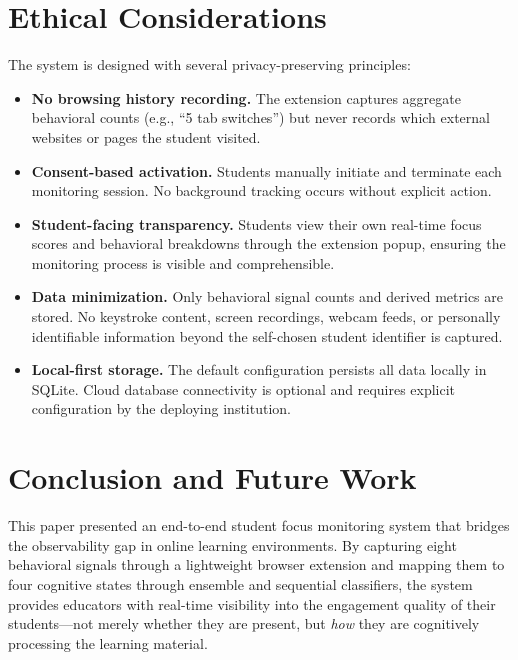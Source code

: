 \documentclass[conference]{IEEEtran}
\begin{document}
\section{Ethical Considerations}

The system is designed with several privacy-preserving principles:

\begin{itemize}[leftmargin=*]
    \item \textbf{No browsing history recording.} The extension captures aggregate behavioral counts (e.g., ``5 tab switches'') but never records which external websites or pages the student visited.
    \item \textbf{Consent-based activation.} Students manually initiate and terminate each monitoring session. No background tracking occurs without explicit action.
    \item \textbf{Student-facing transparency.} Students view their own real-time focus scores and behavioral breakdowns through the extension popup, ensuring the monitoring process is visible and comprehensible.
    \item \textbf{Data minimization.} Only behavioral signal counts and derived metrics are stored. No keystroke content, screen recordings, webcam feeds, or personally identifiable information beyond the self-chosen student identifier is captured.
    \item \textbf{Local-first storage.} The default configuration persists all data locally in SQLite. Cloud database connectivity is optional and requires explicit configuration by the deploying institution.
\end{itemize}

\section{Conclusion and Future Work}

This paper presented an end-to-end student focus monitoring system that bridges the observability gap in online learning environments. By capturing eight behavioral signals through a lightweight browser extension and mapping them to four cognitive states through ensemble and sequential classifiers, the system provides educators with real-time visibility into the engagement quality of their students---not merely whether they are present, but \textit{how} they are cognitively processing the learning material.
\end{document}
